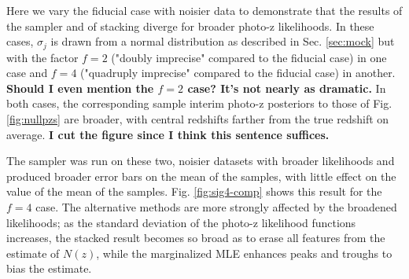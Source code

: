 \documentclass[preprint]{aastex}
\begin{document}
Here we vary the fiducial case with noisier data to demonstrate that the 
results of the sampler and of stacking diverge for broader photo-z likelihoods. 
 In these cases, $\sigma_{j}$ is drawn from a normal distribution as described 
in Sec. \ref{sec:mock} but with the factor $f=2$ ("doubly imprecise" compared 
to the fiducial case) in one case and $f=4$ ("quadruply imprecise" compared to 
the fiducial case) in another.  \textbf{Should I even mention the $f=2$ case?  
It's not nearly as dramatic.}  In both cases, the corresponding sample interim 
photo-z posteriors to those of Fig. \ref{fig:nullpzs} are broader, with central 
redshifts farther from the true redshift on average.  \textbf{I cut the figure 
since I think this sentence suffices.}

%

The sampler was run on these two, noisier datasets with broader likelihoods and 
produced broader error bars on the mean of the samples, with little effect on 
the value of the mean of the samples.  Fig. \ref{fig:sig4-comp} shows this 
result for the $f=4$ case.  The alternative methods are more strongly affected 
by the broadened likelihoods; as the standard deviation of the photo-z 
likelihood functions increases, the stacked result becomes so broad as to erase 
all features from the estimate of $N(z)$, while the marginalized MLE enhances 
peaks and troughs to bias the estimate.
\end{document}

